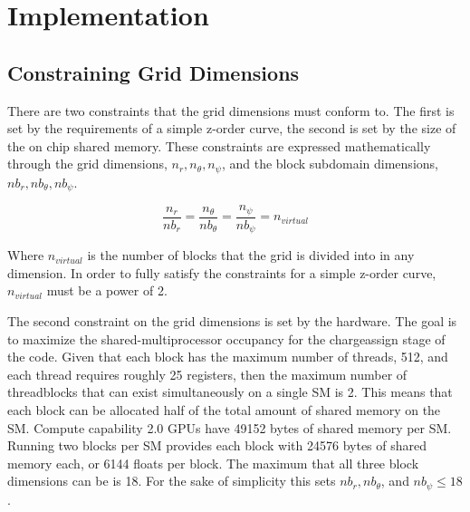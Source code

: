 \chapter{Implementation} 
	\section{Constraining Grid Dimensions}
	\label{sec:grid_constraincts}
There are two constraints that the grid dimensions must conform to. The first is set by the requirements of a simple z-order curve, the second is set by the size of the on chip shared memory. These constraints are expressed mathematically through the grid dimensions, $n_r, n_{\theta}, n_{\psi}$, and the block subdomain dimensions, $nb_r, nb_{\theta}, nb_{\psi}$.
		
\begin{equation}
\frac{n_r}{nb_r} = \frac{n_{\theta}}{nb_{\theta}} = \frac{n_{\psi}}{nb_{\psi}} = n_{virtual}
\end{equation} 

Where $n_{virtual}$ is the number of blocks that the grid is divided into in any dimension. In order to fully satisfy the constraints for a simple z-order curve, $n_{virtual}$ must be a power of 2.

The second constraint on the grid dimensions is set by the hardware. The goal is to maximize the shared-multiprocessor occupancy for the chargeassign stage of the code. Given that each block has the maximum number of threads, 512, and each thread requires roughly 25 registers, then the maximum number of threadblocks that can exist simultaneously on a single SM is 2. This means that each block can be allocated half of the total amount of shared memory on the SM. Compute capability 2.0 GPUs have 49152 bytes of shared memory per SM. Running two blocks per SM provides each block with 24576 bytes of shared memory each, or 6144 floats per block. The maximum that all three block dimensions can be is 18. For the sake of simplicity this sets $nb_r, nb_{\theta}$, and $nb_{\psi} \le 18$. 

